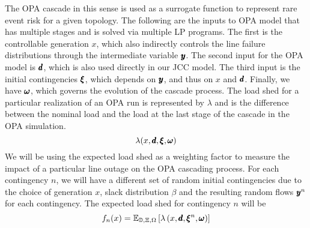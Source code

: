 The OPA cascade in this sense is used as a surrogate function to represent rare event risk for a given topology.  The following are the inputs to OPA model that has multiple stages and is solved via multiple LP programs.  The first is the controllable generation $x$, which also indirectly controls the line failure distributions through the intermediate variable $\pmb{y}$.  The second input for the OPA model is $\pmb{d}$, which is also used directly in our JCC model.  The third input is the initial contingencies $\pmb{\xi}$, which depends on $\pmb{y}$, and thus on $x$ and $\pmb{d}$.  Finally, we have $\pmb{\omega}$, which governs the evolution of the cascade process. The load shed for a particular realization of an OPA run is represented by $\lambda$ and is the difference between the nominal load and the load at the last stage of the cascade in the OPA simulation.
\begin{equation}
\lambda ( x, \pmb{d}, \pmb{\xi}, \pmb{\omega} )
\end{equation}
We will be using the expected load shed as a weighting factor to measure the impact of a particular line outage on the OPA cascading process.  For each contingency $n$, we will have a different set of random initial contingencies due to the choice of generation $x$, slack distribution $\beta$ and the resulting random flows $\pmb{y}^n$ for each contingency.  The expected load shed for contingency $n$ will be
\begin{equation*}
f_n(x) = \mathbb{E}_{\mathbb{D}, \Xi,\Omega} \left[  \lambda\left(x,\pmb{d},\pmb{\xi}^n,\pmb{\omega}\right)  \right]
\end{equation*}



